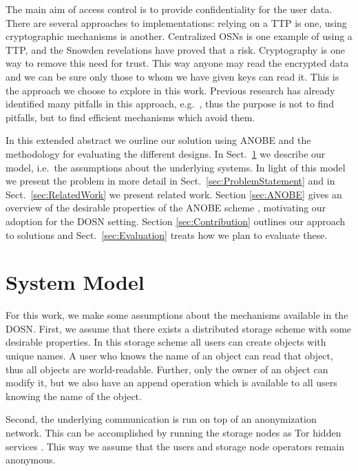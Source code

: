 The main aim of access control is to provide confidentiality for the user 
data.
There are several approaches to implementations: relying on a \ac{TTP} is one, 
using cryptographic mechanisms is another.
Centralized \acp{OSN} is one example of using a \ac{TTP}, and the Snowden 
revelations \cite{prism} have proved that a risk.
Cryptography is one way to remove this need for trust.
This way anyone may read the encrypted data and we can be sure only those to 
whom we have given keys can read it.
This is the approach we choose to explore in this work.
Previous research has already identified many pitfalls in this approach, 
e.g.~\cite{metadata}, thus the purpose is not to find pitfalls, but to find 
efficient mechanisms which avoid them.

In this extended abstract we ourline our solution using \ac{ANOBE} and the 
methodology for evaluating the different designs.
In Sect.~\ref{sec:SystemModel} we describe our model, i.e.~the assumptions 
about the underlying systems.
In light of this model we present the problem in more detail in 
Sect.~\ref{sec:ProblemStatement} and in Sect.~\ref{sec:RelatedWork} we present 
related work.
Section \ref{sec:ANOBE} gives an overview of the desirable properties of the 
\ac{ANOBE} scheme \cite{anobe}, motivating our adoption for the \ac{DOSN} 
setting.
Section \ref{sec:Contribution} outlines our approach to solutions and 
Sect.~\ref{sec:Evaluation} treats how we plan to evaluate these.


\section{System Model}\label{sec:SystemModel}

For this work, we make some assumptions about the mechanisms available in the 
\ac{DOSN}.
First, we assume that there exists a distributed storage scheme with some 
desirable properties.
In this storage scheme all users can create objects with unique names.
A user who knows the name of an object can read that object, thus all objects 
are world-readable.
Further, only the owner of an object can modify it, but we also have an append 
operation which is available to all users knowing the name of the object.

Second, the underlying communication is run on top of an anonymization 
network.
This can be accomplished by running the storage nodes as Tor hidden services 
\cite{tor}.
This way we assume that the users and storage node operators remain anonymous.

